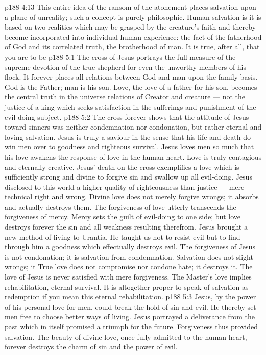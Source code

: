 \vs p188 4:13 This entire idea of the ransom of the atonement places salvation upon a plane of unreality; such a concept is purely philosophic. Human salvation is  it is based on two realities which may be grasped by the creature’s faith and thereby become incorporated into individual human experience: the fact of the fatherhood of God and its correlated truth, the brotherhood of man. It is true, after all, that you are to be 
\vs p188 5:1 The cross of Jesus portrays the full measure of the supreme devotion of the true shepherd for even the unworthy members of his flock. It forever places all relations between God and man upon the family basis. God is the Father; man is his son. Love, the love of a father for his son, becomes the central truth in the universe relations of Creator and creature --- not the justice of a king which seeks satisfaction in the sufferings and punishment of the evil\hyp{}doing subject.
\vs p188 5:2 The cross forever shows that the attitude of Jesus toward sinners was neither condemnation nor condonation, but rather eternal and loving salvation. Jesus is truly a saviour in the sense that his life and death do win men over to goodness and righteous survival. Jesus loves men so much that his love awakens the response of love in the human heart. Love is truly contagious and eternally creative. Jesus’ death on the cross exemplifies a love which is sufficiently strong and divine to forgive sin and swallow up all evil\hyp{}doing. Jesus disclosed to this world a higher quality of righteousness than justice --- mere technical right and wrong. Divine love does not merely forgive wrongs; it absorbs and actually destroys them. The forgiveness of love utterly transcends the forgiveness of mercy. Mercy sets the guilt of evil\hyp{}doing to one side; but love destroys forever the sin and all weakness resulting therefrom. Jesus brought a new method of living to Urantia. He taught us not to resist evil but to find through him a goodness which effectually destroys evil. The forgiveness of Jesus is not condonation; it is salvation from condemnation. Salvation does not slight wrongs; it  True love does not compromise nor condone hate; it destroys it. The love of Jesus is never satisfied with mere forgiveness. The Master’s love implies rehabilitation, eternal survival. It is altogether proper to speak of salvation as redemption if you mean this eternal rehabilitation.
\vs p188 5:3 Jesus, by the power of his personal love for men, could break the hold of sin and evil. He thereby set men free to choose better ways of living. Jesus portrayed a deliverance from the past which in itself promised a triumph for the future. Forgiveness thus provided salvation. The beauty of divine love, once fully admitted to the human heart, forever destroys the charm of sin and the power of evil.
